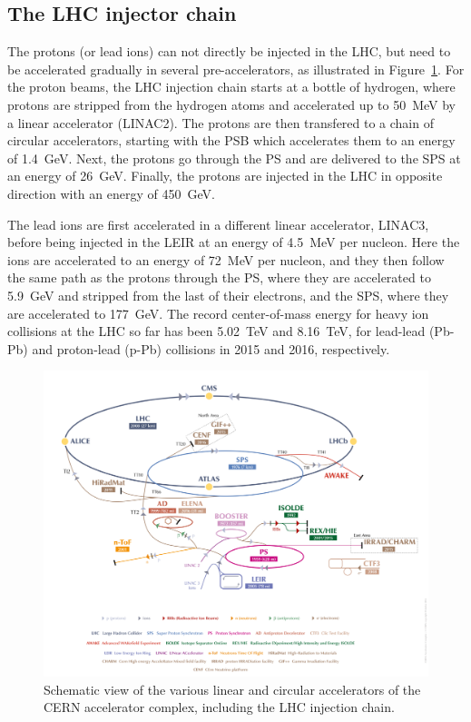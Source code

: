 \subsection{The LHC injector chain}

The protons (or lead ions) can not directly be injected in the \ac{LHC}, but need to be accelerated gradually in several pre-accelerators, as illustrated in Figure~\ref{fig:accelerators}. For the proton beams, the \ac{LHC} injection chain starts at a bottle of hydrogen, where protons are stripped from the hydrogen atoms and accelerated up to \SI{50}{MeV} by a linear accelerator (LINAC2). The protons are then transfered to a chain of circular accelerators, starting with the \ac{PSB} which accelerates them to an energy of \SI{1.4}{GeV}. Next, the protons go through the \ac{PS} and are delivered to the \ac{SPS} at an energy of \SI{26}{GeV}. Finally, the protons are injected in the \ac{LHC} in opposite direction with an energy of \SI{450}{GeV}. 

The lead ions are first accelerated in a different linear accelerator, LINAC3, before being injected in the \ac{LEIR} at an energy of \SI{4.5}{MeV} per nucleon. Here the ions are accelerated to an energy of \SI{72}{MeV} per nucleon, and they then follow the same path as the protons through the \ac{PS}, where they are accelerated to \SI{5.9}{GeV} and stripped from the last of their electrons, and the \ac{SPS}, where they are accelerated to \SI{177}{GeV}. The record center-of-mass energy for heavy ion collisions at the \ac{LHC} so far has been \SI{5.02}{TeV} and \SI{8.16}{TeV}, for lead-lead (Pb-Pb) and proton-lead (p-Pb) collisions in 2015 and 2016, respectively.

\begin{figure}[ht]
  \centering
 \includegraphics[width=.75\textwidth]{lhc_complex}
 \caption{Schematic view of the various linear and circular accelerators of the \ac{CERN} accelerator complex, including the \ac{LHC} injection chain.}
 \label{fig:accelerators}
\end{figure}

